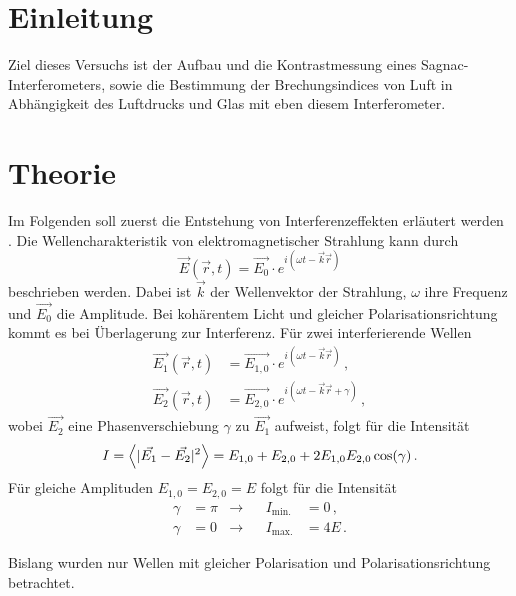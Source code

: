\section{Einleitung}

Ziel dieses Versuchs ist der Aufbau und die Kontrastmessung eines Sagnac-Interferometers, sowie die Bestimmung der Brechungsindices von Luft in Abhängigkeit des Luftdrucks und Glas mit eben diesem Interferometer.

\section{Theorie}

Im Folgenden soll zuerst die Entstehung von Interferenzeffekten erläutert werden \cite{Lit1}.
Die Wellencharakteristik von elektromagnetischer Strahlung kann durch
\begin{equation*}
  \vec{E}(\vec{r},t) = \vec{E_0} \cdot e^{i(\omega t - \vec{k}\vec{r})}
\end{equation*}
beschrieben werden.
Dabei ist $\vec{k}$ der Wellenvektor der Strahlung, $\omega$ ihre Frequenz und $\vec{E_0}$ die Amplitude.
Bei kohärentem Licht und gleicher Polarisationsrichtung kommt es bei Überlagerung zur Interferenz.
Für zwei interferierende Wellen
\begin{align*}
  \vec{E_1}(\vec{r},t) &= \vec{E_{1,0}} \cdot e^{i(\omega t - \vec{k}\vec{r})} \, , \\
  \vec{E_2}(\vec{r},t) &= \vec{E_{2,0}} \cdot e^{i(\omega t - \vec{k}\vec{r} + \gamma)} \, ,
\end{align*}
wobei $\vec{E_2}$ eine Phasenverschiebung $\gamma$ zu $\vec{E_1}$ aufweist, folgt für die Intensität
\begin{equation}
  I = \Bigl \langle |\vec{E_1} - \vec{E_2}|^2 \Bigr \rangle = E_{1,0} + E_{2,0} + 2 E_{1,0} E_{2,0} \cos(\gamma) \, .
  \label{eqn:Intensität}
\end{equation}
Für gleiche Amplituden $E_{1,0} = E_{2,0} = E$ folgt für die Intensität
\begin{equation}  \label{eqn:Gl2}
  \begin{aligned}
  \gamma &= \pi &\rightarrow& &I_\text{min.} &= 0 \, , \\
  \gamma &= 0 &\rightarrow& &I_\text{max.} &= 4E \, .
\end{aligned}
\end{equation}

\bigskip

Bislang wurden nur Wellen mit gleicher Polarisation und Polarisationsrichtung betrachtet.


